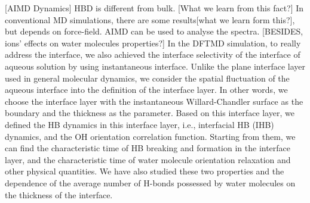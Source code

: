 [AIMD Dynamics]
HBD is different from bulk. [What we learn from this fact?]
In conventional MD simulations, there are some results[what we learn form this?], but depends on force-field.  
AIMD can be used to analyse the spectra.
[BESIDES, ions' effects on water molecules properties?] 
%
In the DFTMD simulation, to really address the interface, we also achieved the interface selectivity of the interface of aqueous solution by using instantaneous interface. 
Unlike the plane interface layer used in general molecular dynamics, we consider the spatial fluctuation of the aqueous interface into the definition of the interface layer. 
In other words, we choose the interface layer with the instantaneous Willard-Chandler surface as the boundary and the thickness as the parameter. 
Based on this interface layer, we defined the HB dynamics in this interface layer, i.e., interfacial HB (IHB) dynamics, and the OH orientation correlation function. 
Starting from them, we can find the characteristic time of HB breaking and formation in the interface layer, 
and the characteristic time of water molecule orientation relaxation and other physical quantities. 
We have also studied these two properties and the dependence of the average number of H-bonds possessed by water molecules on the thickness of the interface. 


